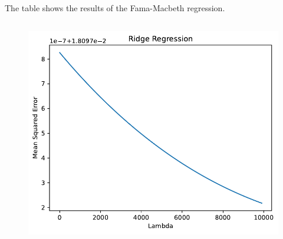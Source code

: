 \documentclass[hidelinks,12pt]{article}
\begin{document}
\FloatBarrier

\section{}
\subsection{}
\begin{table}[htbp]
    \centering
    \caption{The table shows the results of the Fama-Macbeth regression.}
    \resizebox{.9\textwidth}{!}{}
\end{table}

\subsection{}
\begin{figure}[htbp]
    \centering
    \includegraphics[width=.95\textwidth]{out/2_2.pdf}
\end{figure}

\FloatBarrier
\end{document}
